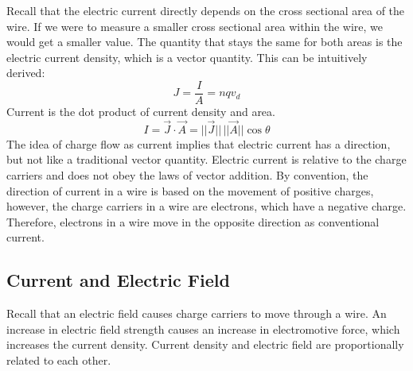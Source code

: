 \documentclass[12pt, titlepage]{article}
\begin{document}
Recall that the electric current directly depends on the cross sectional area of the wire. If we were to measure a smaller cross sectional area within the wire, we would get a smaller value. The quantity that stays the same for both areas is the electric current density, which is a vector quantity. This can be intuitively derived:
\begin{equation*}
    J = \frac{I}{A} = nqv_d
\end{equation*}
Current is the dot product of current density and area.
\begin{equation*}
    I = \vec{J} \cdot \vec{A} = ||\vec{J}||\,||\vec{A}|| \cos{\theta}
\end{equation*}
The idea of charge flow as current implies that electric current has a direction, but not like a traditional vector quantity. Electric current is relative to the charge carriers and does not obey the laws of vector addition. By convention, the direction of current in a wire is based on the movement of positive charges, however, the charge carriers in a wire are electrons, which have a negative charge. Therefore, electrons in a wire move in the opposite direction as conventional current.

\subsection*{Current and Electric Field}
Recall that an electric field causes charge carriers to move through a wire. An increase in electric field strength causes an increase in electromotive force, which increases the current density. Current density and electric field are proportionally related to each other.
\end{document}
